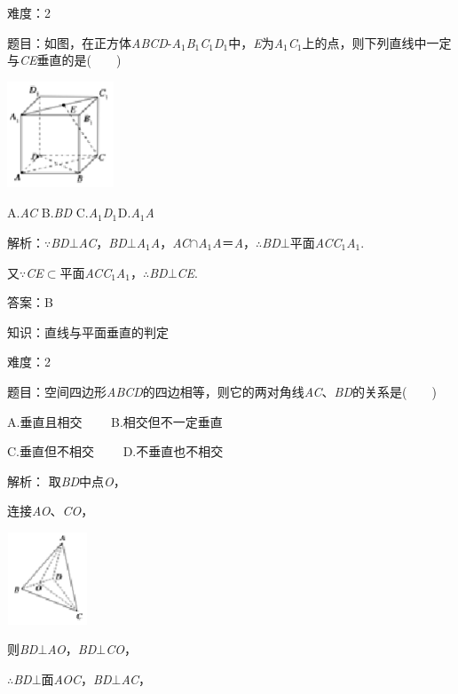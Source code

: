 \documentclass{article} %
\begin{document}
难度：2

题目：如图，在正方体\textit{ABCD}-\textit{A}${}_{1}$\textit{B}${}_{1}$\textit{C}${}_{1}$\textit{D}${}_{1}$中，\textit{E}为\textit{A}${}_{1}$\textit{C}${}_{1}$上的点，则下列直线中一定与\textit{CE}垂直的是(　　)

\includegraphics*[width=1.25in, height=1.25in, keepaspectratio=false]{image200}

A.\textit{AC }B.\textit{BD }C.\textit{A}${}_{1}$\textit{D}${}_{1}$${}_{ }$D.\textit{A}${}_{1}$\textit{A}

解析：$\mathrm{\because}$\textit{BD}$\mathrm{\bot}$\textit{AC}，\textit{BD}$\mathrm{\bot}$\textit{A}${}_{1}$\textit{A}，\textit{AC}$\mathrm{\cap}$\textit{A}${}_{1}$\textit{A}＝\textit{A}，$\mathrm{\therefore}$\textit{BD}$\mathrm{\bot}$平面\textit{ACC}${}_{1}$\textit{A}${}_{1}$.

又$\mathrm{\because}$\textit{CE}$\mathrm{\subset }$平面\textit{ACC}${}_{1}$\textit{A}${}_{1}$，$\mathrm{\therefore}$\textit{BD}$\mathrm{\bot}$\textit{CE}.

答案：B

知识：直线与平面垂直的判定

难度：2

题目：空间四边形\textit{ABCD}的四边相等，则它的两对角线\textit{AC}、\textit{BD}的关系是(　　)

A.垂直且相交　　  B.相交但不一定垂直

C.垂直但不相交　　  D.不垂直也不相交

解析：
取\textit{BD}中点\textit{O}，

连接\textit{AO}、\textit{CO}，

\includegraphics*[width=0.94in, height=1.08in, keepaspectratio=false]{image201}

则\textit{BD}$\mathrm{\bot}$\textit{AO}，\textit{BD}$\mathrm{\bot}$\textit{CO}，

$\mathrm{\therefore}$\textit{BD}$\mathrm{\bot}$面\textit{AOC}，\textit{BD}$\mathrm{\bot}$\textit{AC}，
\end{document}
